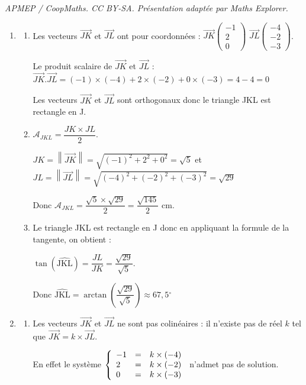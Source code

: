 \documentclass[10pt]{article}
\providecommand{\degres}{\ensuremath{^\circ}}
\providecommand{\vect}[1]{\overrightarrow{#1}}
\providecommand{\degres}{{^\circ}}
\begin{document}
\noindent\textit{APMEP / CoopMaths. CC BY-SA. Présentation adaptée par Maths Explorer.}\par\medskip
\bigskip

\begin{enumerate}
	\item 
	\begin{enumerate}
		\item Les vecteurs $\vect{JK}$ et $\vect{JL}$ ont pour coordonnées : \(\overrightarrow{JK}\begin{pmatrix}-1\\2\\0\end{pmatrix}\) \quad \(\overrightarrow{JL}\begin{pmatrix}-4\\-2\\-3\end{pmatrix}\).

Le produit scalaire de  $\vect{JK}$ et $\vect{JL}$ : $\vect{JK}.\vect{JL}=(-1)\times(-4)+2\times (-2)+0\times (-3)=4-4=0$

Les vecteurs $\vect{JK}$ et $\vect{JL}$ sont orthogonaux donc le triangle JKL est rectangle en J.
		\item $\mathcal{A}_{JKL}=\dfrac{JK\times JL}{2}$.

		$JK= \left\|\vect{JK}\right\| =\sqrt{(-1)^2+2^2+0^2}=\sqrt{5}$ et $JL=\left\|\vect{JL}\right\|=\sqrt{(-4)^2+(-2)^2+(-3)^2}=\sqrt{29}$

Donc $\mathcal{A}_{JKL}=\dfrac{\sqrt{5}\times \sqrt{29}}{2}=\dfrac{\sqrt{145}}{2}$ cm.
		\item Le triangle JKL est rectangle en J donc en appliquant la formule de la tangente, on obtient :

		$\tan \left(\widehat{\text{JKL}}\right)=\dfrac{JL}{JK}=\dfrac{\sqrt{29}}{\sqrt{5}}$.

Donc $\widehat{\text{JKL}}=\arctan\left(\dfrac{\sqrt{29}}{\sqrt{5}}\right)\approx 67,5\degres$
	\end{enumerate}

	\item
	\begin{enumerate}
\item Les vecteurs $\vect{JK}$ et $\vect{JL}$ ne sont pas colinéaires : il n'existe pas de réel $k$ tel que $\vect{JK}=k\times \vect{JL}$.

En effet le système $\left\{\begin{array}{l c l} -1&=&k\times (-4)\\2 &=& k\times (-2)\\0&=& k\times (-3) \end{array}\right.$ n'admet pas de solution.


\end{enumerate}
\end{enumerate}
\end{document}
